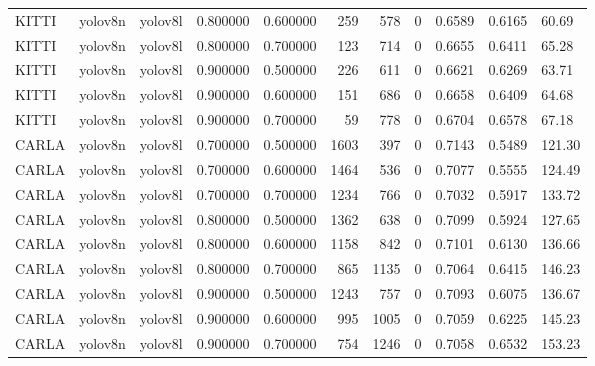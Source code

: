 \begin{tabular}{lllrrrrrlll}
KITTI & yolov8n & yolov8l & 0.800000 & 0.600000 & 259 & 578 & 0 & 0.6589 & 0.6165 & 60.69 \\
KITTI & yolov8n & yolov8l & 0.800000 & 0.700000 & 123 & 714 & 0 & 0.6655 & 0.6411 & 65.28 \\
KITTI & yolov8n & yolov8l & 0.900000 & 0.500000 & 226 & 611 & 0 & 0.6621 & 0.6269 & 63.71 \\
KITTI & yolov8n & yolov8l & 0.900000 & 0.600000 & 151 & 686 & 0 & 0.6658 & 0.6409 & 64.68 \\
KITTI & yolov8n & yolov8l & 0.900000 & 0.700000 & 59 & 778 & 0 & 0.6704 & 0.6578 & 67.18 \\
CARLA & yolov8n & yolov8l & 0.700000 & 0.500000 & 1603 & 397 & 0 & 0.7143 & 0.5489 & 121.30 \\
CARLA & yolov8n & yolov8l & 0.700000 & 0.600000 & 1464 & 536 & 0 & 0.7077 & 0.5555 & 124.49 \\
CARLA & yolov8n & yolov8l & 0.700000 & 0.700000 & 1234 & 766 & 0 & 0.7032 & 0.5917 & 133.72 \\
CARLA & yolov8n & yolov8l & 0.800000 & 0.500000 & 1362 & 638 & 0 & 0.7099 & 0.5924 & 127.65 \\
CARLA & yolov8n & yolov8l & 0.800000 & 0.600000 & 1158 & 842 & 0 & 0.7101 & 0.6130 & 136.66 \\
CARLA & yolov8n & yolov8l & 0.800000 & 0.700000 & 865 & 1135 & 0 & 0.7064 & 0.6415 & 146.23 \\
CARLA & yolov8n & yolov8l & 0.900000 & 0.500000 & 1243 & 757 & 0 & 0.7093 & 0.6075 & 136.67 \\
CARLA & yolov8n & yolov8l & 0.900000 & 0.600000 & 995 & 1005 & 0 & 0.7059 & 0.6225 & 145.23 \\
CARLA & yolov8n & yolov8l & 0.900000 & 0.700000 & 754 & 1246 & 0 & 0.7058 & 0.6532 & 153.23 \\
\bottomrule
\end{tabular}
